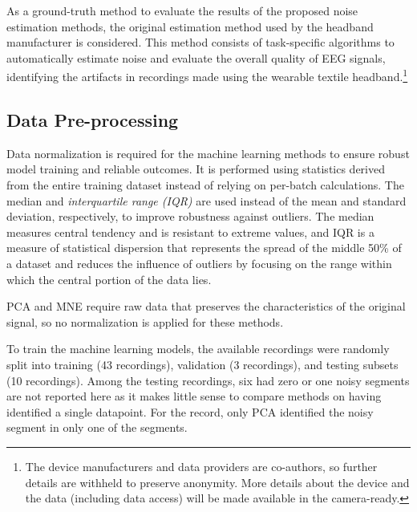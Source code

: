 \documentclass[runningheads]{llncs}
\begin{document}
As a ground-truth method to evaluate the results of the proposed noise
estimation methods, the original estimation method used by the
headband manufacturer is considered. This method consists of
task-specific algorithms to automatically estimate noise and evaluate
the overall quality of EEG signals, identifying the artifacts in
recordings made using the wearable textile headband.\footnote{The
  device manufacturers and data providers are co-authors, so further
  details are withheld to preserve anonymity. More details about the
  device and the data (including data access) will be made available in
  the camera-ready.}


\subsection{Data Pre-processing}

Data normalization is required for the machine learning methods to
ensure robust model training and reliable outcomes. It is performed
using statistics derived from the entire training dataset instead of
relying on per-batch calculations. The median and
\emph{interquartile range (IQR)} are used instead of the mean and
standard deviation, respectively, to improve robustness against
outliers. The median measures central tendency and is resistant to
extreme values, and IQR is a measure of statistical dispersion that
represents the spread of the middle 50\% of a dataset and reduces the
influence of outliers by focusing on the range within which the
central portion of the data lies.




PCA and MNE require raw data that preserves the characteristics of the
original signal, so no normalization is applied for these methods.

To train the machine learning models, the available recordings were
randomly split into training (43 recordings), validation (3
recordings), and testing subsets (10 recordings). Among the testing
recordings, six had zero or one noisy segments are not reported here
as it makes little sense to compare methods on having identified a
single datapoint. For the record, only PCA identified the noisy
segment in only one of the segments.
\end{document}
